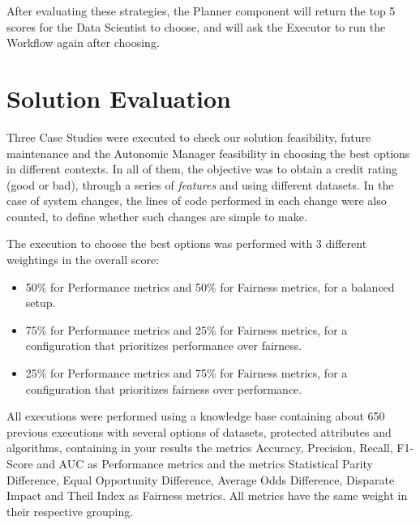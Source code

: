 \documentclass[10pt,conference]{IEEEtran}
\begin{document}
After evaluating these strategies, the Planner component will return the top 5 scores for the Data Scientist to choose, and will ask the Executor to run the Workflow again after choosing.

\section{Solution Evaluation}

Three Case Studies were executed to check our solution feasibility, future maintenance and the Autonomic Manager feasibility in choosing the best options in different contexts. In all of them, the objective was to obtain a credit rating (good or bad), through a series of \textit{features} and using different datasets. In the case of system changes, the lines of code performed in each change were also counted, to define whether such changes are simple to make.

The execution to choose the best options was performed with 3 different weightings in the overall score:

\begin{itemize}
\item 50\% for Performance metrics and 50\% for Fairness metrics, for a balanced setup.
\item 75\% for Performance metrics and 25\% for Fairness metrics, for a configuration that prioritizes performance over fairness.
\item 25\% for Performance metrics and 75\% for Fairness metrics, for a configuration that prioritizes fairness over performance.
\end{itemize}

All executions were performed using a knowledge base containing about 650 previous executions with several options of datasets, protected attributes and algorithms, containing in your results the metrics Accuracy, Precision, Recall, F1-Score and AUC as Performance metrics and the metrics Statistical Parity Difference, Equal Opportunity Difference, Average Odds Difference, Disparate Impact and Theil Index as Fairness metrics. All metrics have the same weight in their respective grouping.
\end{document}
